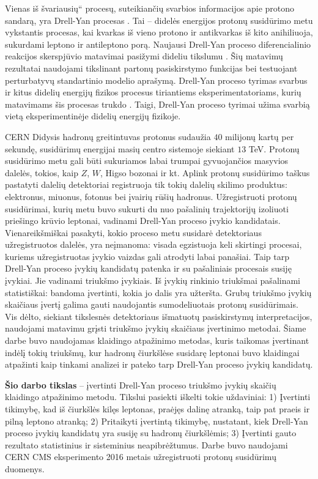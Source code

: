 \documentclass[a4paper, 12pt, oneside]{article}
\newcommand{\ltq}[1]{{\quotedblbase{}#1\textquotedblleft{}}}
\newlength\q
\begin{document}
Vienas iš \ltq{švariausių} procesų, suteikiančių svarbios informacijos apie protono sandarą, yra
Drell-Yan procesas \cite{DYoriginal}.
Tai -- didelės energijos protonų susidūrimo metu vykstantis procesas, kai kvarkas iš vieno protono ir antikvarkas
iš kito anihiliuoja, sukurdami leptono ir antileptono porą.
Naujausi Drell-Yan proceso diferencialinio reakcijos skerspjūvio matavimai pasižymi dideliu tikslumu
\cite{DY_CMS2013, DY_ATLAS2013, DY_ATLAS2014, DY_CMS2015, DY_ATLAS2016, DY_ATLAS2017, DY_CMS2019}.
Šių matavimų rezultatai naudojami tikslinant partonų pasiskirstymo funkcijas bei testuojant perturbatyvų standartinio
modelio aprašymą.
Drell-Yan proceso tyrimas svarbus ir kitus didelių energijų fizikos procesus tiriantiems eksperimentatoriams,
kurių matavimams šis procesas trukdo \cite{Higgs2018, Zprime, SUSYtau}.
Taigi, Drell-Yan proceso tyrimai užima svarbią vietą eksperimentinėje didelių energijų fizikoje.

CERN Didysis hadronų greitintuvas protonus sudaužia $40$ milijonų kartų per sekundę, susidūrimų energijai masių
centro sistemoje siekiant $13$ TeV.
Protonų susidūrimo metu gali būti sukuriamos labai trumpai gyvuojančios masyvios dalelės, tokios, kaip
$Z$, $W$, Higso bozonai ir kt.
Aplink protonų susidūrimo taškus pastatyti dalelių detektoriai registruoja tik tokių dalelių skilimo produktus:
elektronus, miuonus, fotonus bei įvairių rūšių hadronus.
Užregistruoti protonų susidūrimai, kurių metu buvo sukurti du nuo pašalinių trajektorijų izoliuoti priešingo krūvio
leptonai, vadinami Drell-Yan proceso įvykio kandidatais.
Vienareikšmiškai pasakyti, kokio proceso metu susidarė detektoriaus užregistruotos dalelės, yra neįmanoma:
visada egzistuoja keli skirtingi procesai, kuriems užregistruotas įvykio vaizdas gali atrodyti labai panašiai.
Taip tarp Drell-Yan proceso įvykių kandidatų patenka ir su pašaliniais procesais susiję įvykiai.
Jie vadinami triukšmo įvykiais.
Iš įvykių rinkinio triukšmai pašalinami statistiškai: bandoma įvertinti, kokia jo dalis yra užteršta.
Grubų triukšmo įvykių skaičiaus įvertį galima gauti naudojantis sumodeliuotais protonų susidūrimais.
Vis dėlto, siekiant tikslesnės detektoriaus išmatuotų pasiskirstymų interpretacijos, naudojami matavimu grįsti
triukšmo įvykių skaičiaus įvertinimo metodai.
Šiame darbe buvo naudojamas klaidingo atpažinimo metodas, kuris taikomas įvertinant indėlį tokių triukšmų, kur
hadronų čiurkšlėse susidarę leptonai buvo klaidingai atpažinti kaip tinkami analizei ir pateko tarp Drell-Yan proceso įvykių kandidatų.

\textbf{Šio darbo tikslas} -- įvertinti Drell-Yan proceso triukšmo įvykių skaičių klaidingo atpažinimo metodu.
Tikslui pasiekti iškelti tokie uždaviniai:
1) Įvertinti tikimybę, kad iš čiurkšlės kilęs leptonas, praėjęs dalinę atranką, taip pat praeis ir pilną leptono atranką;
2) Pritaikyti įvertintą tikimybę, nustatant, kiek Drell-Yan proceso įvykių kandidatų yra susiję su hadronų čiurkšlėmis;
3) Įvertinti gauto rezultato statistinius ir sisteminius neapibrėžtumus.
Darbe buvo naudojami CERN CMS eksperimento 2016 metais užregistruoti protonų susidūrimų duomenys.
\end{document}
